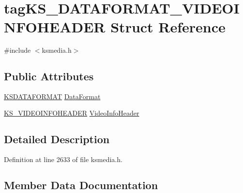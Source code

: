 \hypertarget{structtag_k_s___d_a_t_a_f_o_r_m_a_t___v_i_d_e_o_i_n_f_o_h_e_a_d_e_r}{}\section{tag\+K\+S\+\_\+\+D\+A\+T\+A\+F\+O\+R\+M\+A\+T\+\_\+\+V\+I\+D\+E\+O\+I\+N\+F\+O\+H\+E\+A\+D\+ER Struct Reference}
\label{structtag_k_s___d_a_t_a_f_o_r_m_a_t___v_i_d_e_o_i_n_f_o_h_e_a_d_e_r}


{\ttfamily \#include $<$ksmedia.\+h$>$}

\subsection*{Public Attributes}
\begin{DoxyCompactItemize}
\item 
\hyperlink{union_k_s_d_a_t_a_f_o_r_m_a_t}{K\+S\+D\+A\+T\+A\+F\+O\+R\+M\+AT} \hyperlink{structtag_k_s___d_a_t_a_f_o_r_m_a_t___v_i_d_e_o_i_n_f_o_h_e_a_d_e_r_a5630b26b6566a488da6eb2deb2a0c471}{Data\+Format}
\item 
\hyperlink{ksmedia_8h_ade1656979c41e0f7252475edf5e86528}{K\+S\+\_\+\+V\+I\+D\+E\+O\+I\+N\+F\+O\+H\+E\+A\+D\+ER} \hyperlink{structtag_k_s___d_a_t_a_f_o_r_m_a_t___v_i_d_e_o_i_n_f_o_h_e_a_d_e_r_abd7c5a3743bec1f15c6aae1b4b328407}{Video\+Info\+Header}
\end{DoxyCompactItemize}


\subsection{Detailed Description}


Definition at line 2633 of file ksmedia.\+h.



\subsection{Member Data Documentation}
